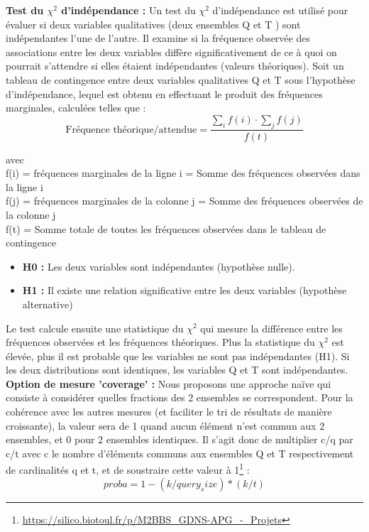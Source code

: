 \documentclass[a4paper,11pt,openright]{report}
\begin{document}
\textbf{Test du $\chi^2$ d'indépendance : } 
Un test du $\chi^2$ d'indépendance est utilisé pour évaluer si deux variables qualitatives (deux ensembles Q et T ) sont indépendantes l'une de l'autre. Il examine si la fréquence observée des associations entre les deux variables diffère significativement de ce à quoi on pourrait s'attendre si elles étaient indépendantes (valeurs théoriques). Soit un tableau de contingence entre deux variables qualitatives Q et T sous l’hypothèse d’indépendance, lequel
est obtenu en effectuant le produit des fréquences marginales, calculées telles que : \\
\begin{equation}
\text{Fréquence théorique/attendue} = \frac{\sum_{i} f(i) \cdot \sum_{j} f(j)}{f(t)}
\end{equation}

avec \\
f(i)  = fréquences marginales de la ligne i = Somme des fréquences observées dans la ligne i \\
f(j)  = fréquences marginales de la colonne j = Somme des fréquences observées de la colonne j \\
f(t)  = Somme totale de toutes les fréquences observées dans le tableau de contingence \\ 

\begin{itemize}
\item \textbf{H0 : } Les deux variables sont indépendantes (hypothèse nulle). 
\item \textbf{H1 : } Il existe une relation significative entre les deux variables (hypothèse alternative)
\end{itemize}

Le test calcule ensuite une statistique du  $\chi^2$ qui mesure la différence entre les fréquences observées et les fréquences théoriques. Plus la statistique du  $\chi^2$ est élevée, plus il est probable que les variables ne sont pas indépendantes (H1). Si les deux distributions sont identiques, les variables Q et
T sont indépendantes. \\

\textbf{Option de mesure 'coverage' : } Nous proposons une approche naïve qui consiste à considérer quelles fractions des 2 ensembles se correspondent. Pour la cohérence avec les autres mesures (et faciliter le tri de résultats de manière croissante), la valeur sera de 1 quand aucun élément n'est commun aux 2 ensembles, et 0 pour 2 ensembles identiques. Il s'agit donc de multiplier c/q par c/t avec c le nombre d'éléments communs aux ensembles Q et T respectivement de cardinalités q et t, et de soustraire cette valeur à 1\footnote{\url{https://silico.biotoul.fr/p/M2BBS_GDNS-APG_-_Projets}} :
\begin{equation}
proba = 1 - (k/query_size) * (k/t)
\end{equation}
\end{document}
